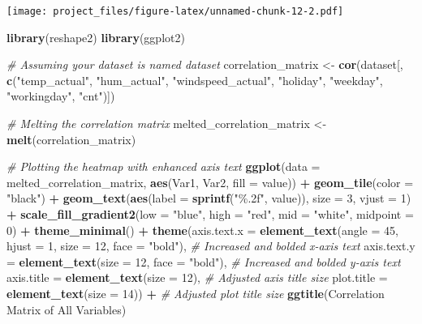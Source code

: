 \documentclass[
]{article}
\newenvironment{Shaded}{\begin{snugshade}}{\end{snugshade}}
\newcommand{\AttributeTok}[1]{\textcolor[rgb]{0.13,0.29,0.53}{#1}}
\newcommand{\CommentTok}[1]{\textcolor[rgb]{0.56,0.35,0.01}{\textit{#1}}}
\newcommand{\DecValTok}[1]{\textcolor[rgb]{0.00,0.00,0.81}{#1}}
\newcommand{\FunctionTok}[1]{\textcolor[rgb]{0.13,0.29,0.53}{\textbf{#1}}}
\newcommand{\NormalTok}[1]{#1}
\newcommand{\OtherTok}[1]{\textcolor[rgb]{0.56,0.35,0.01}{#1}}
\newcommand{\SpecialCharTok}[1]{\textcolor[rgb]{0.81,0.36,0.00}{\textbf{#1}}}
\newcommand{\StringTok}[1]{\textcolor[rgb]{0.31,0.60,0.02}{#1}}
\begin{document}
\texttt{[image: project\_files/figure-latex/unnamed-chunk-12-2.pdf]}

\begin{Shaded}
\begin{Highlighting}[]
\FunctionTok{library}\NormalTok{(reshape2)}
\FunctionTok{library}\NormalTok{(ggplot2)}

\CommentTok{\# Assuming your dataset is named \textquotesingle{}dataset\textquotesingle{}}
\NormalTok{correlation\_matrix }\OtherTok{\textless{}{-}} \FunctionTok{cor}\NormalTok{(dataset[, }\FunctionTok{c}\NormalTok{(}\StringTok{"temp\_actual"}\NormalTok{, }\StringTok{"hum\_actual"}\NormalTok{, }\StringTok{"windspeed\_actual"}\NormalTok{, }\StringTok{"holiday"}\NormalTok{, }\StringTok{"weekday"}\NormalTok{, }\StringTok{"workingday"}\NormalTok{, }\StringTok{"cnt"}\NormalTok{)])}

\CommentTok{\# Melting the correlation matrix}
\NormalTok{melted\_correlation\_matrix }\OtherTok{\textless{}{-}} \FunctionTok{melt}\NormalTok{(correlation\_matrix)}

\CommentTok{\# Plotting the heatmap with enhanced axis text}
\FunctionTok{ggplot}\NormalTok{(}\AttributeTok{data =}\NormalTok{ melted\_correlation\_matrix, }\FunctionTok{aes}\NormalTok{(Var1, Var2, }\AttributeTok{fill =}\NormalTok{ value)) }\SpecialCharTok{+}
    \FunctionTok{geom\_tile}\NormalTok{(}\AttributeTok{color =} \StringTok{"black"}\NormalTok{) }\SpecialCharTok{+}
    \FunctionTok{geom\_text}\NormalTok{(}\FunctionTok{aes}\NormalTok{(}\AttributeTok{label =} \FunctionTok{sprintf}\NormalTok{(}\StringTok{"\%.2f"}\NormalTok{, value)), }\AttributeTok{size =} \DecValTok{3}\NormalTok{, }\AttributeTok{vjust =} \DecValTok{1}\NormalTok{) }\SpecialCharTok{+}
    \FunctionTok{scale\_fill\_gradient2}\NormalTok{(}\AttributeTok{low =} \StringTok{"blue"}\NormalTok{, }\AttributeTok{high =} \StringTok{"red"}\NormalTok{, }\AttributeTok{mid =} \StringTok{"white"}\NormalTok{, }\AttributeTok{midpoint =} \DecValTok{0}\NormalTok{) }\SpecialCharTok{+}
    \FunctionTok{theme\_minimal}\NormalTok{() }\SpecialCharTok{+}
    \FunctionTok{theme}\NormalTok{(}\AttributeTok{axis.text.x =} \FunctionTok{element\_text}\NormalTok{(}\AttributeTok{angle =} \DecValTok{45}\NormalTok{, }\AttributeTok{hjust =} \DecValTok{1}\NormalTok{, }\AttributeTok{size =} \DecValTok{12}\NormalTok{, }\AttributeTok{face =} \StringTok{"bold"}\NormalTok{),  }\CommentTok{\# Increased and bolded x{-}axis text}
          \AttributeTok{axis.text.y =} \FunctionTok{element\_text}\NormalTok{(}\AttributeTok{size =} \DecValTok{12}\NormalTok{, }\AttributeTok{face =} \StringTok{"bold"}\NormalTok{),  }\CommentTok{\# Increased and bolded y{-}axis text}
          \AttributeTok{axis.title =} \FunctionTok{element\_text}\NormalTok{(}\AttributeTok{size =} \DecValTok{12}\NormalTok{),  }\CommentTok{\# Adjusted axis title size}
          \AttributeTok{plot.title =} \FunctionTok{element\_text}\NormalTok{(}\AttributeTok{size =} \DecValTok{14}\NormalTok{)) }\SpecialCharTok{+}  \CommentTok{\# Adjusted plot title size}
    \FunctionTok{ggtitle}\NormalTok{(}\StringTok{\textquotesingle{}Correlation Matrix of All Variables\textquotesingle{}}\NormalTok{)}
\end{Highlighting}
\end{Shaded}
\end{document}
